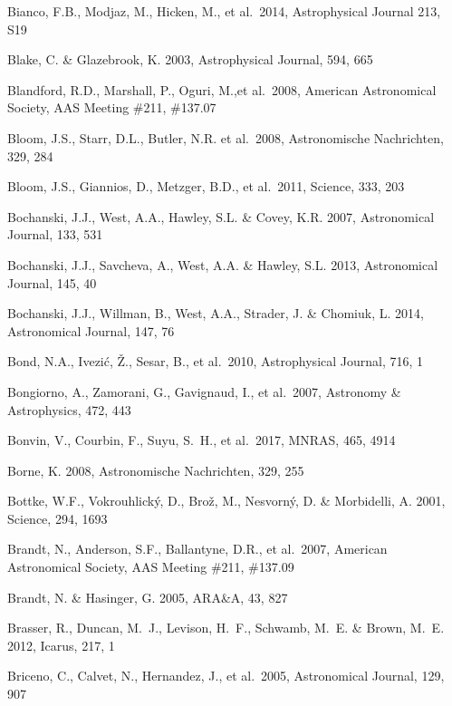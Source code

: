 \documentclass{emulateapj}
\begin{document}
\begin{thebibliography}{}
\bibitem[()]{} Bianco, F.B., Modjaz, M., Hicken, M., et al.~2014, Astrophysical Journal 213, S19

\bibitem[()]{} Blake, C. \& Glazebrook, K. 2003, Astrophysical Journal, 594, 665

\bibitem[()]{} Blandford, R.D., Marshall, P., Oguri, M.,et al.~2008,
                           American Astronomical Society, AAS Meeting \#211, \#137.07

\bibitem[()]{} Bloom, J.S., Starr, D.L., Butler, N.R. et al.~2008, Astronomische Nachrichten, 329, 284


\bibitem[()]{} Bloom, J.S., Giannios, D., Metzger, B.D., et al.~2011, Science, 333, 203

\bibitem[()]{} Bochanski, J.J., West, A.A., Hawley, S.L. \& Covey, K.R. 2007, Astronomical Journal, 133, 531

\bibitem[()]{} Bochanski, J.J., Savcheva, A., West, A.A. \& Hawley, S.L. 2013, Astronomical Journal, 145, 40

\bibitem[()]{} Bochanski, J.J., Willman, B., West, A.A., Strader, J. \& Chomiuk, L. 2014, Astronomical Journal, 147, 76

\bibitem[()]{} Bond, N.A.,  Ivezi\'{c}, \v{Z}., Sesar, B., et al.~2010, Astrophysical Journal, 716, 1

\bibitem[()]{} Bongiorno, A., Zamorani, G., Gavignaud, I., et al.~2007, Astronomy \& Astrophysics, 472, 443

\bibitem[()]{} Bonvin, V., Courbin, F., Suyu, S.~H., et al.\ 2017, MNRAS, 465, 4914

\bibitem[()]{} Borne, K. 2008, Astronomische Nachrichten, 329, 255


\bibitem[()]{} Bottke, W.F., Vokrouhlick\'{y}, D., Bro\v{z}, M., Nesvorn\'y, D. \& Morbidelli, A. 2001,
             Science, 294, 1693

\bibitem[()]{} Brandt, N., Anderson, S.F., Ballantyne, D.R., et al.~2007, American Astronomical
             Society, AAS Meeting \#211, \#137.09

\bibitem[()]{} Brandt, N. \& Hasinger, G. 2005, ARA\&A, 43, 827

\bibitem[()]{} Brasser, R., Duncan, M.~J., Levison, H.~F., Schwamb, M.~E. \& Brown, M.~E. 2012, Icarus, 217, 1

\bibitem[()]{} Briceno, C., Calvet, N., Hernandez, J., et al.~2005, Astronomical Journal, 129, 907


\end{thebibliography}
\end{document}
